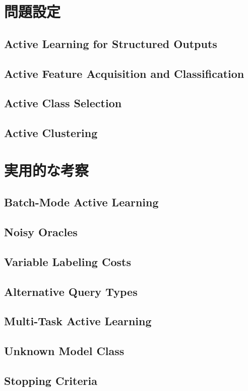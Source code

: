 \documentclass[11pt]{report}
\begin{document}
\section{問題設定}
\subsection{Active Learning for Structured Outputs}
\subsection{Active Feature Acquisition and Classification}
\subsection{Active Class Selection}
\subsection{Active Clustering}

\section{実用的な考察}
\subsection{Batch-Mode Active Learning}
\subsection{Noisy Oracles}
\subsection{Variable Labeling Costs}
\subsection{Alternative Query Types}
\subsection{Multi-Task Active Learning}
\subsection{Unknown Model Class}
\subsection{Stopping Criteria}



\end{document}
